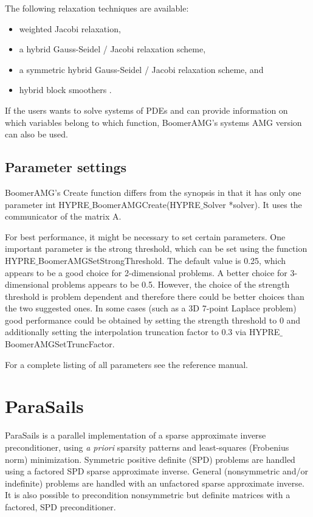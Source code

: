 The following relaxation techniques are available:
\begin{itemize}
\item weighted Jacobi relaxation,
\item a hybrid Gauss-Seidel / Jacobi relaxation scheme, 
\item a symmetric hybrid Gauss-Seidel / Jacobi relaxation scheme, and
\item hybrid block smoothers \cite{UMYang_2004}.
\end{itemize}

If the users wants to solve systems of PDEs and can provide information on
which variables belong to which function, BoomerAMG's systems AMG version
can also be used.


\subsection{Parameter settings}

BoomerAMG's Create function differs from the synopsis in that it has only one parameter
int HYPRE$\_$BoomerAMGCreate(HYPRE$\_$Solver *solver). It uses the communicator 
of the matrix A.

For best performance, it might be necessary to set certain parameters.
One important parameter is the strong threshold, which can be set
using the function HYPRE$\_$BoomerAMGSetStrongThreshold.
The default value is 0.25, which appears to be a good choice for 2-dimensional
problems. A better choice for 3-dimensional problems appears to be 0.5. However,
the choice of the strength threshold is problem dependent and therefore
there could be better choices than the two suggested ones.
In some cases (such as a 3D 7-point Laplace problem) good performance
could be obtained by setting the strength threshold to 0 and additionally
setting the interpolation truncation factor to 0.3 
via HYPRE$\_$BoomerAMGSetTruncFactor.

For a complete listing of all parameters see the reference manual.

\section{ParaSails}

ParaSails is a parallel implementation of a sparse approximate inverse
preconditioner, using {\em a priori} sparsity patterns and least-squares
(Frobenius norm) minimization.  Symmetric positive definite (SPD) problems
are handled using a factored SPD sparse approximate inverse.  General
(nonsymmetric and/or indefinite) problems are handled with an
unfactored sparse approximate inverse.  It is also possible to
precondition nonsymmetric but definite matrices with a factored, SPD
preconditioner.

